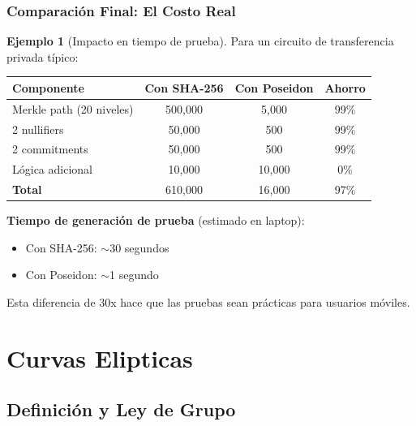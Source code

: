 \documentclass[11pt,a4paper,twoside,openright]{book}
\theoremstyle{definition}
\newtheorem{example}{Ejemplo}[chapter]
\theoremstyle{plain}
\theoremstyle{remark}
\begin{document}
\subsubsection{Comparación Final: El Costo Real}

\begin{example}[Impacto en tiempo de prueba]
Para un circuito de transferencia privada típico:

\begin{center}
\begin{tabular}{lccc}
\toprule
\textbf{Componente} & \textbf{Con SHA-256} & \textbf{Con Poseidon} & \textbf{Ahorro} \\
\midrule
Merkle path (20 niveles) & 500,000 & 5,000 & 99\% \\
2 nullifiers & 50,000 & 500 & 99\% \\
2 commitments & 50,000 & 500 & 99\% \\
Lógica adicional & 10,000 & 10,000 & 0\% \\
\midrule
\textbf{Total} & 610,000 & 16,000 & 97\% \\
\bottomrule
\end{tabular}
\end{center}

\textbf{Tiempo de generación de prueba} (estimado en laptop):
\begin{itemize}
    \item Con SHA-256: $\sim$30 segundos
    \item Con Poseidon: $\sim$1 segundo
\end{itemize}

Esta diferencia de 30x hace que las pruebas sean prácticas para usuarios móviles.
\end{example}
\section{Curvas Elipticas}


\subsection{Definición y Ley de Grupo}
\end{document}
